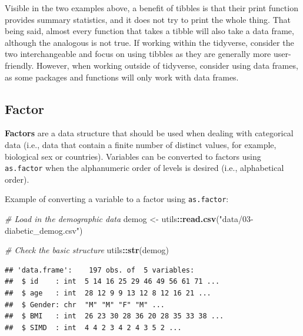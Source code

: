 \documentclass[
]{book}
\newenvironment{Shaded}{\begin{snugshade}}{\end{snugshade}}
\newcommand{\CommentTok}[1]{\textcolor[rgb]{0.56,0.35,0.01}{\textit{#1}}}
\newcommand{\FunctionTok}[1]{\textcolor[rgb]{0.13,0.29,0.53}{\textbf{#1}}}
\newcommand{\NormalTok}[1]{#1}
\newcommand{\OtherTok}[1]{\textcolor[rgb]{0.56,0.35,0.01}{#1}}
\newcommand{\SpecialCharTok}[1]{\textcolor[rgb]{0.81,0.36,0.00}{\textbf{#1}}}
\newcommand{\StringTok}[1]{\textcolor[rgb]{0.31,0.60,0.02}{#1}}
\begin{document}
Visible in the two examples above, a benefit of tibbles is that their print function provides summary statistics, and it does not try to print the whole thing. That being said, almost every function that takes a tibble will also take a data frame, although the analogous is not true. If working within the tidyverse, consider the two interchangeable and focus on using tibbles as they are generally more user-friendly. However, when working outside of tidyverse, consider using data frames, as some packages and functions will only work with data frames.

\subsection{Factor}\label{sec:factor}

\textbf{Factors} are a data structure that should be used when dealing with categorical data (i.e., data that contain a finite number of distinct values, for example, biological sex or countries). Variables can be converted to factors using \texttt{as.factor} when the alphanumeric order of levels is desired (i.e., alphabetical order).

Example of converting a variable to a factor using \texttt{as.factor}:

\begin{Shaded}
\begin{Highlighting}[]
\CommentTok{\# Load in the demographic data}
\NormalTok{demog }\OtherTok{\textless{}{-}}\NormalTok{ utils}\SpecialCharTok{::}\FunctionTok{read.csv}\NormalTok{(}\StringTok{"data/03{-}diabetic\_demog.csv"}\NormalTok{)}

\CommentTok{\# Check the basic structure}
\NormalTok{utils}\SpecialCharTok{::}\FunctionTok{str}\NormalTok{(demog)}
\end{Highlighting}
\end{Shaded}

\begin{verbatim}
## 'data.frame':    197 obs. of  5 variables:
##  $ id    : int  5 14 16 25 29 46 49 56 61 71 ...
##  $ age   : int  28 12 9 9 13 12 8 12 16 21 ...
##  $ Gender: chr  "M" "M" "F" "M" ...
##  $ BMI   : int  26 23 30 28 36 20 28 35 33 38 ...
##  $ SIMD  : int  4 4 2 3 4 2 4 3 5 2 ...
\end{verbatim}

\begin{Shaded}
\end{Shaded}
\end{document}
